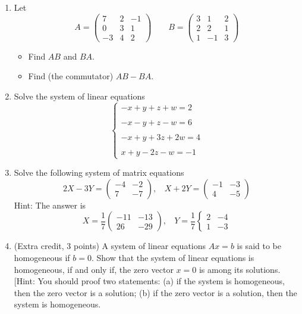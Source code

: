 \documentclass[fleqn]{article}
\begin{document}
  \begin{enumerate}
    \item Let 
    $$A=\begin{pmatrix}
      7 & 2 & -1 \\
      0 & 3 & 1 \\
      -3 & 4 & 2
    \end{pmatrix} ~~~~~~~~~ B=\begin{pmatrix}
      3 & 1 & 2 \\
      2 & 2 & 1 \\
      1 & -1 & 3
    \end{pmatrix}$$

      \begin{itemize}
        \item Find $AB$ and $BA$.
        \item Find (the commutator) $AB-BA$.
      \end{itemize}
    
    \item Solve the system of linear equations
      $$
        \begin{cases}
          -x+y+z+w=2 \\
          \\
          -x-y+z-w=6 \\
          \\
          -x+y+3z+2w=4 \\
          \\
          x+y-2z-w=-1
        \end{cases}
      $$

    \item Solve the following system of matrix equations
      $$
        2X-3Y=\begin{pmatrix}
          -4 & -2 \\
          7 & -7
        \end{pmatrix}, ~~~~ X+2Y=\begin{pmatrix}
          -1 & -3 \\
          4 & -5
        \end{pmatrix}
      $$
      Hint: The answer is 
      $$
        X=\dfrac{1}{7}\begin{pmatrix}
          -11 & -13 \\
          26 & -29
        \end{pmatrix}, ~~~~ Y=\dfrac{1}{7}\begin{cases}
          2 & -4 \\
          1 & -3
        \end{cases}
      $$


    \item (Extra credit, 3 points) A system of linear equations $Ax=b$ is said to be homogeneous if
    $b=0$. Show that the system of linear equations is homogeneous, if and only if, the zero
    vector $x=0$ is among its solutions.
    [Hint: You should proof two statements: (a) if the system is homogeneous, 
    then the zero vector is a solution; (b) if the zero vector is a solution,
    then the system is homogeneous.
  
  \end{enumerate}
\end{document}
